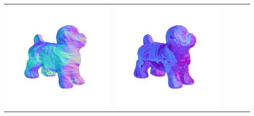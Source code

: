 \begin{center}
\begin{tabularx}{\linewidth}{@{}Y@{}Y@{}Y@{}Y@{}Y@{}Y@{}}
\includegraphics[width=\linewidth]{semisynthetic/20160617_17_yu_out.png} &
\includegraphics[width=\linewidth]{semisynthetic/20160617_17_dpsn_out.png} &

\end{tabularx}
\end{center}
